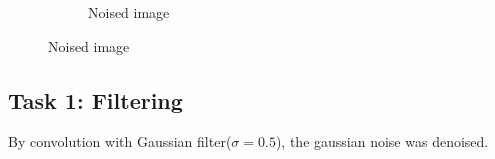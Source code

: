 \documentclass[paper=a4, fontsize=11pt]{scrartcl} %
\numberwithin{equation}{section} %
\numberwithin{figure}{section} %
\numberwithin{table}{section} %
\begin{document}
\begin{figure}[H]
	\begin{subfigure}[b]{0.3\textwidth}
		\noindent{}
	\caption{Noised image}
	\end{subfigure}
\end{figure}


\subsection{Task 1: Filtering}

By convolution with Gaussian filter($\sigma = 0.5$), the gaussian noise was denoised. 
\end{document}
